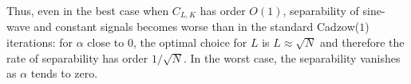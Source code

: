 \documentclass[sii]{ipart}
\newtheorem{proposition}{Proposition}
\begin{document}
Thus, even in the best case when $C_{L,K}$ has order $O(1)$, separability of sine-wave and constant signals becomes worse than in the standard Cadzow($1$) iterations: for $\alpha$ close to 0, the optimal choice for $L$ is $L \approx \sqrt{N}$ and therefore the rate of separability has order $1/\sqrt{N}$.
In the worst case, the separability vanishes as $\alpha$ tends to zero.

%
%
\end{document}
